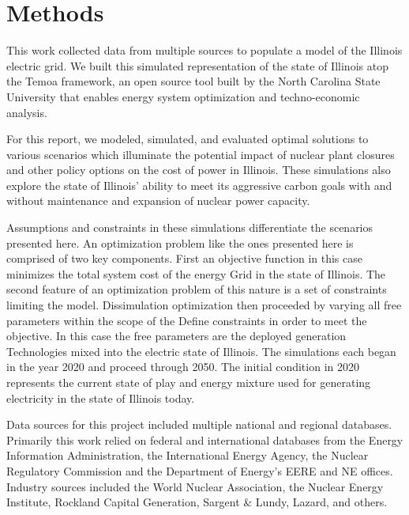 \section{Methods}

This work collected data from multiple sources to populate a model of the 
Illinois electric grid. We built this simulated representation of the state of 
Illinois atop the Temoa framework, an open source tool built by the North 
Carolina State University that enables energy system optimization and techno-economic analysis. 


For this report, we modeled, simulated, and evaluated optimal solutions to 
various scenarios which illuminate the potential impact of nuclear plant 
closures and other policy options on the cost of power in Illinois. These 
simulations  also explore the state of Illinois' ability to meet its aggressive 
carbon goals with and without maintenance and expansion of nuclear power 
capacity. 

Assumptions and constraints in these simulations differentiate the scenarios 
presented here. An optimization problem like the ones presented here is 
comprised of two key components. First an objective function in this case 
minimizes the total system cost of the energy Grid in the state of Illinois. 
The second feature of an optimization problem of this nature is a set of 
constraints limiting the model. Dissimulation optimization then proceeded by 
varying all free parameters within the scope of the Define constraints in order 
to meet the objective. In this case the free parameters are the deployed 
generation Technologies mixed into the electric state of Illinois. The 
simulations each began in the year 2020 and proceed through 2050. The initial 
condition in 2020 represents the current state of play and energy mixture used 
for generating electricity in the state of Illinois today.


Data sources for this project included multiple national and regional 
databases. Primarily this work relied on federal and international databases from the 
Energy Information Administration, the International Energy Agency, the Nuclear 
Regulatory Commission and the Department of Energy's EERE and NE offices. 
Industry sources included the World Nuclear Association, the Nuclear Energy 
Institute, Rockland Capital Generation, Sargent \& Lundy, Lazard, and others.


